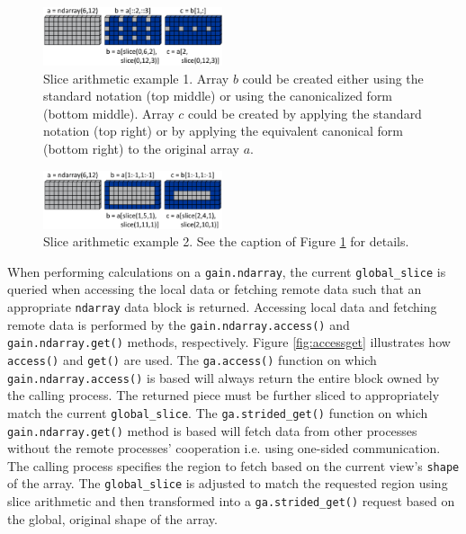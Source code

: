 \documentclass{sigplanconf}
\begin{document}
\begin{figure}[htb]
\centering
\includegraphics[width=0.47\textwidth]{image4a_crop.eps}
\caption{
Slice arithmetic example 1. Array $b$ could be created either using the
standard notation (top middle) or using the canonicalized form (bottom
middle). Array $c$ could be created by applying the standard notation (top
right) or by applying the equivalent canonical form (bottom right) to the
original array $a$.
}
\label{fig:slice1}
\end{figure}

\begin{figure}[htb]
\centering
\includegraphics[width=0.47\textwidth]{image4b_crop.eps}
\caption{
Slice arithmetic example 2. See the caption of Figure \ref{fig:slice1} for
details.
}
\label{fig:figslice2}
\end{figure}

When performing calculations on a \verb=gain.ndarray=, the current
\verb=global_slice= is queried when accessing the local data or fetching
remote data such that an appropriate \verb=ndarray= data block is returned.
Accessing local data and fetching remote data is performed by the
\verb=gain.ndarray.access()= and \verb=gain.ndarray.get()= methods,
respectively.  Figure \ref{fig:accessget} illustrates how \verb=access()= and
\verb=get()= are used. The \verb=ga.access()= function on which\linebreak
\verb=gain.ndarray.access()= is based will always return the entire block
owned by the calling process. The returned piece must be further sliced to
appropriately match the current \verb=global_slice=. The
\verb=ga.strided_get()= function on which \verb=gain.ndarray.get()= method is
based will fetch data from other processes without the remote processes'
cooperation i.e. using one-sided communication.  The calling process specifies
the region to fetch based on the current view's \verb=shape= of the array. The
\verb=global_slice= is adjusted to match the requested region using slice
arithmetic and then transformed into a \verb=ga.strided_get()= request based
on the global, original shape of the array.
\end{document}
